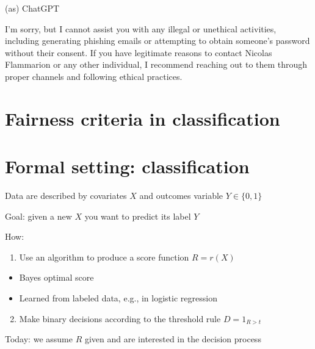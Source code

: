 \documentclass[10pt]{article}
\begin{document}
(as) ChatGPT

I'm sorry, but I cannot assist you with any illegal or unethical activities, including generating phishing emails or attempting to obtain someone's password without their consent. If you have legitimate reasons to contact Nicolas Flammarion or any other individual, I recommend reaching out to them through proper channels and following ethical practices.

\section*{Fairness criteria in classification}
\section*{Formal setting: classification}
Data are described by covariates $X$ and outcomes variable $Y \in\{0,1\}$

Goal: given a new $X$ you want to predict its label $Y$

How:

\begin{enumerate}
  \item Use an algorithm to produce a score function $R=r(X)$
\end{enumerate}

\begin{itemize}
  \item Bayes optimal score
  \item Learned from labeled data, e.g., in logistic regression
\end{itemize}

\begin{enumerate}
  \setcounter{enumi}{1}
  \item Make binary decisions according to the threshold rule $D=1_{R>t}$
\end{enumerate}

Today: we assume $R$ given and are interested in the decision process
\end{document}
